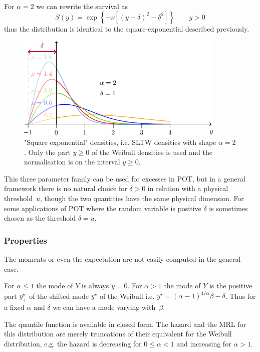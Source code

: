 \documentclass[a4paper]{report}
\begin{document}
For $\alpha=2$ we can rewrite the survival as
$$
   S(y) = \exp\left\{-\nu \left[(y+\delta)^2 - {\delta}^2 \right]\right\} 
   \qquad y > 0
$$
thus the distribution is identical to the square-exponential described previously.

\begin{figure}
  \centering
  \includegraphics[width=10cm]{images/SqExp.pdf}
  \caption{\label{SQEXP}
    "Square exponential" densities, i.e. SLTW densities with shape 
    $\alpha=2$. 
    Only the part $y \geqslant 0$ of the Weibull densities is used and the normalisation
  is on the interval $y \geqslant 0$.}
\end{figure}


This three parameter family can be used for excesses in POT, but 
in a general framework there is no natural choice for $\delta>0$ in relation
with a physical threshold~$u$, though the two quantities have the
same physical dimension. For some applications of POT where the random 
variable is 
positive $\delta$ is sometimes chosen as the threshold $\delta = u$.

\subsubsection*{Properties}
The moments or even the expectation are not easily computed in the general 
case.  

For $\alpha \leqslant 1$ the mode of $Y$ is always $y=0$. For $\alpha>1$  the mode of
$Y$ is the positive part $y_+^\star$ of the shifted mode $y^\star$ of the Weibull i.e.
$y^\star = \left(\alpha - 1\right)^{1/\alpha}\beta - \delta$. 
Thus for a fixed $\alpha$ and $\delta$ we can
have a mode varying with~$\beta$.

The quantile function is available in closed form. 
The hazard and the MRL for this distribution are merely truncations
of their equivalent for the Weibull distribution, e.g. the hazard is 
decreasing for $0 \leqslant \alpha <1$ and 
increasing for $\alpha>1$.
\end{document}
